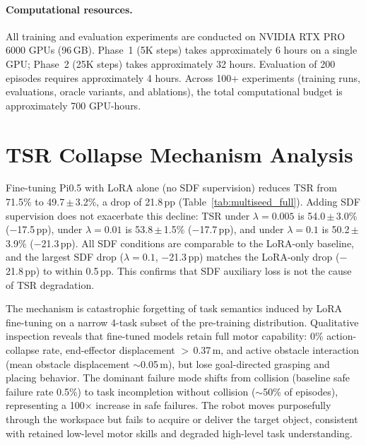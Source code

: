 \paragraph{Computational resources.}
All training and evaluation experiments are conducted on NVIDIA RTX PRO 6000 GPUs (96\,GB). Phase~1 (5K steps) takes approximately 6 hours on a single GPU; Phase~2 (25K steps) takes approximately 32 hours. Evaluation of 200 episodes requires approximately 4 hours. Across 100+ experiments (training runs, evaluations, oracle variants, and ablations), the total computational budget is approximately 700 GPU-hours.


\section{TSR Collapse Mechanism Analysis}
\label{sec:appendix_tsr_collapse}

Fine-tuning Pi0.5 with LoRA alone (no SDF supervision) reduces TSR from 71.5\% to 49.7\,$\pm$\,3.2\%, a drop of 21.8\,pp (Table~\ref{tab:multiseed_full}). Adding SDF supervision does not exacerbate this decline: TSR under $\lambda = 0.005$ is 54.0\,$\pm$\,3.0\% ($-$17.5\,pp), under $\lambda = 0.01$ is 53.8\,$\pm$\,1.5\% ($-$17.7\,pp), and under $\lambda = 0.1$ is 50.2\,$\pm$\,3.9\% ($-$21.3\,pp). All SDF conditions are comparable to the LoRA-only baseline, and the largest SDF drop ($\lambda = 0.1$, $-$21.3\,pp) matches the LoRA-only drop ($-$21.8\,pp) to within 0.5\,pp. This confirms that SDF auxiliary loss is not the cause of TSR degradation.

The mechanism is catastrophic forgetting of task semantics induced by LoRA fine-tuning on a narrow 4-task subset of the pre-training distribution. Qualitative inspection reveals that fine-tuned models retain full motor capability: 0\% action-collapse rate, end-effector displacement $>$\,0.37\,m, and active obstacle interaction (mean obstacle displacement ${\sim}$0.05\,m), but lose goal-directed grasping and placing behavior. The dominant failure mode shifts from collision (baseline safe failure rate 0.5\%) to task incompletion without collision (${\sim}$50\% of episodes), representing a 100$\times$ increase in safe failures. The robot moves purposefully through the workspace but fails to acquire or deliver the target object, consistent with retained low-level motor skills and degraded high-level task understanding.
